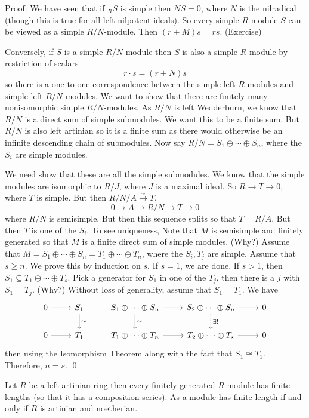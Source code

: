 Proof: We have seen that if $_R S$ is simple then $NS=0$, where $N$ is the nilradical (though this is true for all left nilpotent ideals). So every simple $R$-module $S$ can be viewed as a simple $R/N$-module. Then $(r+M)s=rs$. (Exercise) 

Conversely, if $S$ is a simple $R/N$-module then $S$ is also a simple $R$-module by restriction of scalars
\[
r \cdot s=(r+N)s
\]
so there is a one-to-one correspondence between the simple left $R$-modules and simple left $R/N$-modules. We want to show that there are finitely many nonisomorphic simple $R/N$-modules. As $R/N$ is left Wedderburn, we know that $R/N$ is a direct sum of simple submodules. We want this to be a finite sum. But $R/N$ is also left artinian so it is a finite sum as there would otherwise be an infinite descending chain of submodules. Now say $R/N=S_1 \oplus \cdots \oplus S_n$, where the $S_i$ are simple modules. 

We need show that these are all the simple submodules. We know that the simple modules are isomorphic to $R/J$, where $J$ is a maximal ideal. So $R\longrightarrow T \longrightarrow 0$, where $T$ is simple. But then $R/N/A \stackrel{\sim}{\longrightarrow} T$.
\[
0 \longrightarrow A \longrightarrow R/N \longrightarrow T \longrightarrow 0
\] 
where $R/N$ is semisimple. But then this sequence splits so that $T=R/A$. But then $T$ is one of the $S_i$. To see uniqueness, Note that $M$ is semisimple and finitely generated so that $M$ is a finite direct sum of simple modules. (Why?) Assume that $M=S_1 \oplus \cdots \oplus S_n=T_1 \oplus \cdots \oplus T_n$, where the $S_i,T_j$ are simple. Assume that $s \geq n$. We prove this by induction on $s$. If $s=1$, we are done. If $s>1$, then $S_1 \subseteq T_1 \oplus \cdots \oplus T_s$. Pick a generator for $S_1$ in one of the $T_j$, then there is a $j$ with $S_1=T_j$. (Why?) Without loss of generality, assume that $S_1=T_1$. We have
\[
\begin{tikzcd}
0 \arrow{r} & S_1 \arrow{d}{\sim} & S_1 \oplus \cdots \oplus S_n \arrow{d}{\sim} \arrow{r} & S_2 \oplus \cdots \oplus S_n \arrow[dotted]{d}{\exists !} \arrow{r} & 0 \\
0 \arrow{r} & T_1 & T_1 \oplus \cdots \oplus T_n \arrow{r} & T_2 \oplus \cdots \oplus T_s \arrow{r} & 0 
\end{tikzcd}
\]
then using the Isomorphism Theorem along with the fact that $S_1 \cong T_1$. Therefore, $n=s$. \qed \\

\begin{thm}
Let $R$ be a left artinian ring then every finitely generated $R$-module has finite lengths (so that it has a composition series). As a module has finite length if and only if $R$ is artinian and noetherian.
\end{thm}

